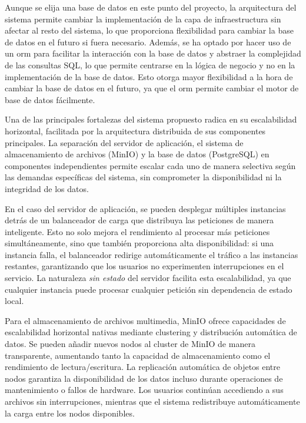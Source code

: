 Aunque se elija una base de datos en este punto del proyecto, la arquitectura del sistema permite cambiar la implementación de la capa de infraestructura sin afectar al resto del sistema, lo que proporciona flexibilidad para cambiar la base de datos en el futuro si fuera necesario.
Además, se ha optado por hacer uso de un \acrshort{orm} para facilitar la interacción con la base de datos y abstraer la complejidad de las consultas SQL, lo que permite centrarse en la lógica de negocio y no en la implementación de la base de datos.
Esto otorga mayor flexibilidad a la hora de cambiar la base de datos en el futuro, ya que el \acrshort{orm} permite cambiar el motor de base de datos fácilmente.

Una de las principales fortalezas del sistema propuesto radica en su escalabilidad horizontal, facilitada por la arquitectura distribuida de sus componentes principales. La separación del servidor de aplicación, el sistema de almacenamiento de archivos (MinIO) y la base de datos (PostgreSQL) en componentes independientes permite escalar cada uno de manera selectiva según las demandas específicas del sistema, sin comprometer la disponibilidad ni la integridad de los datos.

En el caso del servidor de aplicación, se pueden desplegar múltiples instancias detrás de un balanceador de carga que distribuya las peticiones de manera inteligente. Esto no solo mejora el rendimiento al procesar más peticiones simultáneamente, sino que también proporciona alta disponibilidad: si una instancia falla, el balanceador redirige automáticamente el tráfico a las instancias restantes, garantizando que los usuarios no experimenten interrupciones en el servicio. La naturaleza \textit{sin estado} del servidor facilita esta escalabilidad, ya que cualquier instancia puede procesar cualquier petición sin dependencia de estado local.

Para el almacenamiento de archivos multimedia, MinIO ofrece capacidades de escalabilidad horizontal nativas mediante clustering y distribución automática de datos. Se pueden añadir nuevos nodos al cluster de MinIO de manera transparente, aumentando tanto la capacidad de almacenamiento como el rendimiento de lectura/escritura. La replicación automática de objetos entre nodos garantiza la disponibilidad de los datos incluso durante operaciones de mantenimiento o fallos de hardware. Los usuarios continúan accediendo a sus archivos sin interrupciones, mientras que el sistema redistribuye automáticamente la carga entre los nodos disponibles.

